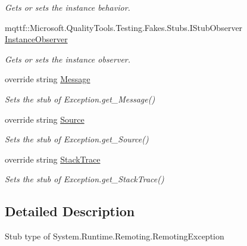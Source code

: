 \begin{DoxyCompactItemize}
\begin{DoxyCompactList}\small\item\em Gets or sets the instance behavior.\end{DoxyCompactList}\item 
mqttf\-::\-Microsoft.\-Quality\-Tools.\-Testing.\-Fakes.\-Stubs.\-I\-Stub\-Observer \hyperlink{class_system_1_1_runtime_1_1_remoting_1_1_fakes_1_1_stub_remoting_exception_a406d3fdb3559afd08ef5eaa6e16ba22f}{Instance\-Observer}
\begin{DoxyCompactList}\small\item\em Gets or sets the instance observer.\end{DoxyCompactList}\item 
override string \hyperlink{class_system_1_1_runtime_1_1_remoting_1_1_fakes_1_1_stub_remoting_exception_aa3ff6da0c10f5faa8b80938e4bebefe2}{Message}
\begin{DoxyCompactList}\small\item\em Sets the stub of Exception.\-get\-\_\-\-Message()\end{DoxyCompactList}\item 
override string \hyperlink{class_system_1_1_runtime_1_1_remoting_1_1_fakes_1_1_stub_remoting_exception_a2429920863746582249a9e4f7779c858}{Source}
\begin{DoxyCompactList}\small\item\em Sets the stub of Exception.\-get\-\_\-\-Source()\end{DoxyCompactList}\item 
override string \hyperlink{class_system_1_1_runtime_1_1_remoting_1_1_fakes_1_1_stub_remoting_exception_a80fa87b10d22869907a3af8b2da488e1}{Stack\-Trace}
\begin{DoxyCompactList}\small\item\em Sets the stub of Exception.\-get\-\_\-\-Stack\-Trace()\end{DoxyCompactList}\end{DoxyCompactItemize}


\subsection{Detailed Description}
Stub type of System.\-Runtime.\-Remoting.\-Remoting\-Exception



